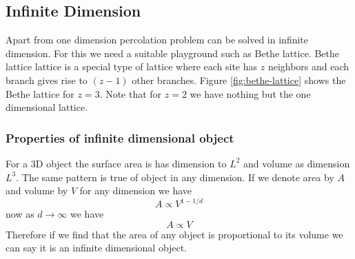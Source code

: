 	\subsection{Infinite Dimension}
	Apart from one dimension percolation problem can be solved in infinite dimension. For this we need a suitable playground such as Bethe lattice. Bethe lattice lattice is a special type of lattice  where each site has $z$ neighbors and each branch gives rise to $(z-1)$ other branches. Figure \ref{fig:bethe-lattice} shows the Bethe lattice for $z=3$. Note that for $z=2$ we have nothing but the one dimensional lattice. \subsubsection{Properties of infinite dimensional object}
	For a 3D object the surface area is has dimension to $L^2$ and volume as dimension $L^3$. The same pattern is true of object in any dimension. If we denote area by $A$ and volume by $V$ for any dimension we have
	\begin{equation}
		A \propto V^{1-1/d}
	\end{equation}
	now as $d \rightarrow \infty$ we have
	\begin{equation}
		A \propto V
	\end{equation}
	Therefore if we find that the area of any object is proportional to its volume we can say it is an infinite dimensional object.
